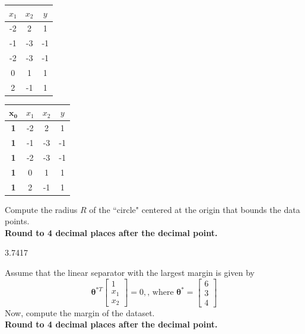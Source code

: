 \documentclass[11pt,addpoints,answers]{exam}
\newcommand{\thetav     }{\boldsymbol \theta     }
\begin{document}
\begin{questions}
\begin{parts}
    \begin{center}
    \begin{tabular}{||c c c||}
        \hline
         $x_1$ & $x_2$ & $y$ \\ [0.5ex]
        \hline\hline
        -2 & 2 & 1 \\
        \hline
        -1 & -3 & -1 \\
        \hline
        -2 & -3 & -1 \\
        \hline
        0 & 1 & 1 \\
        \hline
        2 & -1 & 1 \\
        \hline
    \end{tabular}
    \hspace{4em}
    \begin{tabular}{||c c c c||}
        \hline
        $\bm{x_0}$ & $x_1$ & $x_2$ & $y$ \\ [0.5ex]
        \hline\hline
        \textbf{1} & -2 & 2 & 1 \\
        \hline
        \textbf{1} & -1 & -3 & -1 \\
        \hline
        \textbf{1} & -2 & -3 & -1 \\
        \hline
        \textbf{1} & 0 & 1 & 1 \\
        \hline
        \textbf{1} & 2 & -1 & 1 \\
        \hline
    \end{tabular}
    \end{center}
    
    \begin{subparts}
        \subpart[2] Compute the radius $R$ of the ``circle" centered at the origin that bounds the data points. \\
        \textbf{Round to 4 decimal places after the decimal point.}
        
        \begin{your_solution}[title=Radius:,height=2cm,width=5cm]
        	3.7417
        \end{your_solution}
        
        
        
        \subpart[2] Assume that the linear separator with the largest margin is given by \[\thetav^{*T}\begin{bmatrix}
        1 \\
        x_1 \\
        x_2 
        \end{bmatrix} = 0, \text{, where } \thetav^* = \begin{bmatrix}
        6 \\
        3 \\
        4 
        \end{bmatrix}
        \]
        Now, compute the margin of the dataset.\\
        \textbf{Round to 4 decimal places after the decimal point.}
        

\end{subparts}
\end{parts}
\end{questions}
\end{document}
